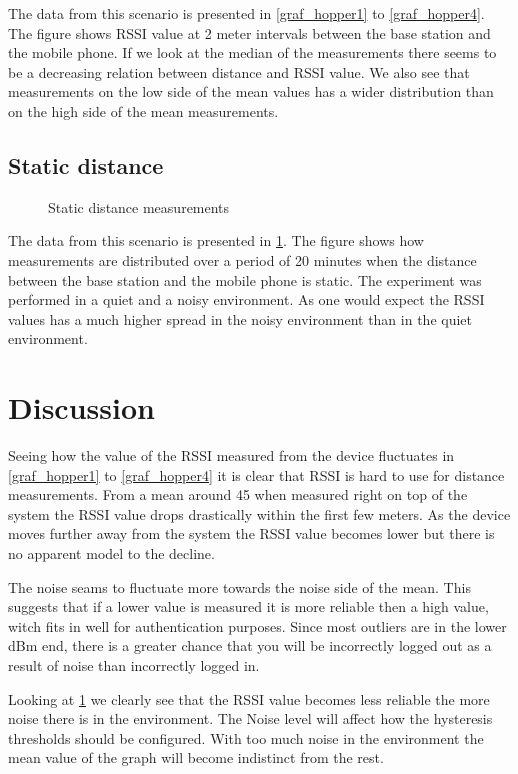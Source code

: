 %	
%	
%	
%	

The data from this scenario is presented in \cref{graf_hopper1} to \cref{graf_hopper4}.
The figure shows RSSI value at 2 meter intervals between the base station and the mobile phone.
If we look at the median of the measurements there seems to be a decreasing relation between distance and RSSI value.
We also see that measurements on the low side of the mean values has a wider distribution than on the high side of the mean measurements.

\section{Static distance}
\begin{figure}
	\centering
	
	
	\caption{Static distance measurements}
	\label{graf_StaticMesurements}
\end{figure}

The data from this scenario is presented in \cref{graf_StaticMesurements}.
The figure shows how measurements are distributed over a period of 20 minutes when the distance between the base station and the mobile phone is static.
The experiment was performed in a quiet and a noisy environment.
As one would expect the RSSI values has a much higher spread in the noisy environment than in the quiet environment. 
 

\chapter{Discussion}
Seeing how the value of the RSSI measured from the device fluctuates in \cref{graf_hopper1} to \cref{graf_hopper4} it is clear that RSSI is hard to use for distance measurements.
From a mean around 45 when measured right on top of the system the RSSI value drops drastically within the first few meters.
As the device moves further away from the system the RSSI value becomes lower but there is no apparent model to the decline.

The noise seams to fluctuate more towards the noise side of the mean. This suggests that if a lower value is measured it is more reliable then a high value, witch fits in well for authentication purposes.
Since most outliers are in the lower dBm end, there is a greater chance that you will be incorrectly logged out as a result of noise than incorrectly logged in.

Looking at \cref{graf_StaticMesurements} we clearly see that the RSSI value becomes less reliable the more noise there is in the environment.
The Noise level will affect how the hysteresis thresholds should be configured.
With too much noise in the environment the mean value of the graph will become indistinct from the rest.

